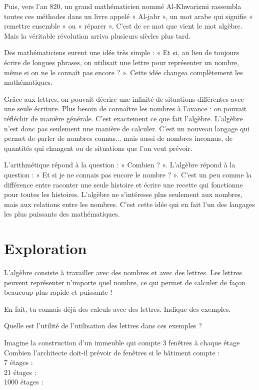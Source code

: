 \documentclass[../../syllabus_1.tex]{subfiles}
\begin{document}
Puis, vers l'an 820, un grand mathématicien nommé Al-Khwarizmi rassembla toutes ces méthodes dans un livre appelé « Al-jabr », un mot arabe qui signifie « remettre ensemble » ou « réparer ». C'est de ce mot que vient le mot algèbre. Mais la véritable révolution arriva plusieurs siècles plus tard.

Des mathématiciens eurent une idée très simple :
« Et si, au lieu de toujours écrire de longues phrases, on utilisait une lettre pour représenter un nombre, même si on ne le connaît pas encore ? ». Cette idée changea complètement les mathématiques.

Grâce aux lettres, on pouvait décrire une infinité de situations différentes avec une seule écriture. Plus besoin de connaître les nombres à l'avance : on pouvait réfléchir de manière générale. C'est exactement ce que fait l'algèbre. L'algèbre n'est donc pas seulement une manière de calculer. C'est un nouveau langage qui permet de parler de nombres connus... mais aussi de nombres inconnus, de quantités qui changent ou de situations que l'on veut prévoir.

L'arithmétique répond à la question : « Combien ? ». L'algèbre répond à la question : « Et si je ne connais pas encore le nombre ? ».
C'est un peu comme la différence entre raconter une seule histoire et écrire une recette qui fonctionne pour toutes les histoires. L'algèbre ne s'intéresse plus seulement aux nombres, mais aux relations entre les nombres. C'est cette idée qui en fait l'un des langages les plus puissants des mathématiques.

\section{Exploration}
L'algèbre consiste à travailler avec des nombres et avec des lettres. Les lettres peuvent représenter n'importe quel nombre, ce qui permet de calculer de façon beaucoup plus rapide et puissante !

En fait, tu connais déjà des calculs avec des lettres. Indique des exemples.

\vspace{2cm}

Quelle est l'utilité de l'utilisation des lettres dans ces exemples ?

\vspace{2cm}

Imagine la construction d'un immeuble qui compte 3 fenêtres à chaque étage Combien l'architecte doit-il prévoir de fenêtres si le bâtiment compte :\\
7 étages :\\
21 étages :\\
1000 étages :\\
\end{document}
